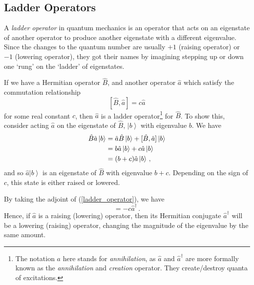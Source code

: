 \documentclass{article}
\theoremstyle{plain}\theoremheaderfont{\normalfont\itshape}\theorembodyfont{\rmfamily}\theoremseparator{.}\newtheorem*{rem}{Remark}\newtheorem*{ex}{Example}\newtheorem*{proof}{Proof}\newtheorem*{altp}{Alternative proof}
\theoremstyle{plain}\theoremheaderfont{\normalfont\bfseries}\theorembodyfont{\rmfamily}\theoremseparator{.}\newtheorem{thm}{Theorem}[section]\newtheorem{lem}[thm]{Lemma}\newtheorem{prop}[thm]{Proposition}\newtheorem*{cor}{Corollary}\newtheorem{defn}[thm]{Definition}\newtheorem{clm}[thm]{Claim}\newtheorem{clminproof}{Claim}
\theoremstyle{break}\theoremheaderfont{\normalfont\itshape}\theorembodyfont{\rmfamily}\theoremseparator{.\medskip}\newtheorem*{proofskip}{Proof}\newtheorem*{exs}{Examples}\newtheorem*{rems}{Remarks}
\theoremstyle{break}\theoremheaderfont{\normalfont\bfseries}\theorembodyfont{\rmfamily}\theoremseparator{.\medskip}\newtheorem{lemskip}[thm]{Lemma}\newtheorem{defnskip}[thm]{Definition}\newtheorem{propskip}[thm]{Proposition}\newtheorem{thmskip}[thm]{Theorem}
\numberwithin{equation}{section}
\newcommand{\ket}[1]{\left| #1 \right\rangle}
\begin{document}
    \subsection{Ladder Operators}\label{Chap:Ladder}
    A \textit{ladder operator} in quantum mechanics is an operator that acts on an eigenstate of another operator to produce another eigenstate with a different eigenvalue. Since the changes to the quantum number are usually \(+1\) (raising operator) or \(-1\) (lowering operator), they got their names by imagining stepping up or down one `rung' on the `ladder' of eigenstates.

    If we have a Hermitian operator \(\hat{B}\), and another operator \(\hat{a}\) which satisfy the commutation relationship
    \begin{equation}\label{ladder_operator}
        [\hat{B},\hat{a}]=c\hat{a}
    \end{equation}
    for some real constant \(c\), then \(\hat{a}\) is a ladder operator\footnote{The notation \(a\) here stands for \textit{annihilation}, as \(\hat{a}\) and \(\hat{a}^\dagger\) are more formally known as the \textit{annihilation} and \textit{creation} operator. They create/destroy quanta of excitations.} for \(\hat{B}\). To show this, consider acting \(\hat{a}\) on the eigenstate of \(\hat{B}\), \(\ket{b}\) with eigenvalue \(b\). We have
    \begin{align}
        \hat{B}\hat{a}\ket{b}&=\hat{a}\hat{B}\ket{b}+[\hat{B},\hat{a}]\ket{b}\notag \\
        &=b\hat{a}\ket{b}+c\hat{a}\ket{b}\notag \\
        &=(b+c)\hat{a}\ket{b}\,,
    \end{align}
    and so \(\hat{a}\ket{b}\) is an eigenstate of \(\hat{B}\) with eigenvalue \(b+c\). Depending on the sign of \(c\), this state is either raised or lowered.

    By taking the adjoint of (\ref{ladder_operator}), we have
    \begin{equation}
        [\hat{B},\hat{a}^\dagger]=-c\hat{a}^\dagger\,.
    \end{equation}
    Hence, if \(\hat{a}\) is a raising (lowering) operator, then its Hermitian conjugate \(\hat{a}^\dagger\) will be a lowering (raising) operator, changing the magnitude of the eigenvalue by the same amount.
\end{document}
